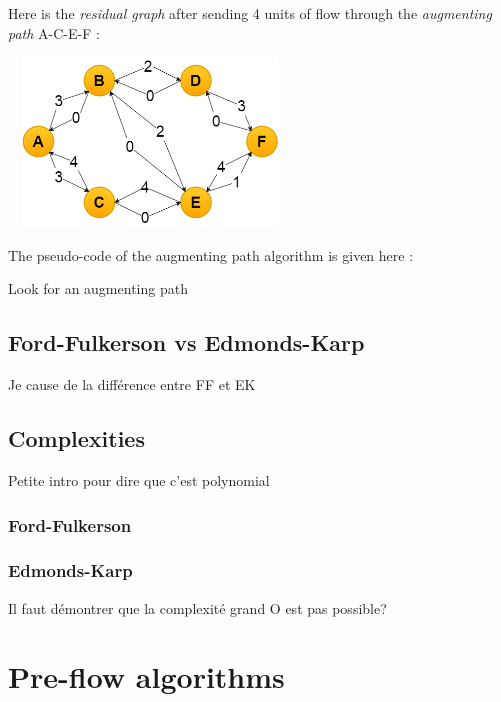 Here is the \textit{residual graph} after sending 4 units of flow through the \textit{augmenting path} A-C-E-F : \newline

\begin{center}
\includegraphics[width=7.5cm,height=4.5cm]{images/residualgraph2.png}
\end{center}

The pseudo-code of the augmenting path algorithm is given here :

\begin{algorithm}[h]

 Look for an augmenting path\;
\end{algorithm}

\subsection{Ford-Fulkerson vs Edmonds-Karp}
Je cause de la différence entre FF et EK

\subsection{Complexities}
Petite intro pour dire que c'est polynomial
\subsubsection{Ford-Fulkerson}

\subsubsection{Edmonds-Karp}
Il faut démontrer que la complexité grand O est pas possible?

\section{Pre-flow algorithms}
